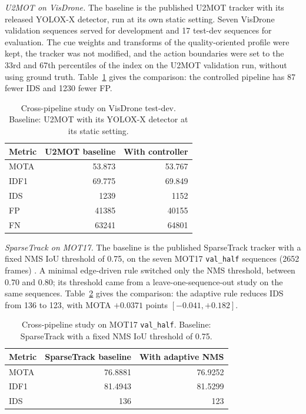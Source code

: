 \documentclass[pdflatex,sn-mathphys-num,iicol]{sn-jnl}
\begin{document}
\emph{U2MOT on VisDrone.} The baseline is the published U2MOT tracker
\cite{liu2023u2mot} with its released YOLOX-X detector, run
at its own static setting. Seven VisDrone validation sequences served for
development and 17 test-dev sequences for evaluation. The cue weights and
transforms of the quality-oriented profile were kept, the tracker was not
modified, and the action boundaries were set to the 33rd and 67th percentiles
of the index on the U2MOT validation run, without using ground truth.
Table~\ref{tab:u2mot} gives the comparison: the controlled pipeline has 87
fewer IDS and 1230 fewer FP.

\begin{table}[t]
\caption{Cross-pipeline study on VisDrone test-dev. Baseline: U2MOT with its
YOLOX-X detector at its static setting.}
\label{tab:u2mot}
\centering\footnotesize
\setlength{\tabcolsep}{4pt}
\begin{tabular}{@{}lrr@{}}
\toprule
Metric & U2MOT baseline & With controller\\
\midrule
MOTA & 53.873 & 53.767\\
IDF1 & 69.775 & 69.849\\
IDS & 1239 & 1152\\
FP & 41385 & 40155\\
FN & 63241 & 64801\\
\bottomrule
\end{tabular}
\end{table}

\emph{SparseTrack on MOT17.} The baseline is the published SparseTrack tracker
\cite{liu2025sparsetrack} with a fixed NMS IoU threshold of 0.75, on the seven
MOT17 \texttt{val\_half} sequences (2652 frames) \cite{dendorfer2021motchallenge}.
A minimal edge-driven rule switched only the NMS threshold, between 0.70 and
0.80; its threshold came from a leave-one-sequence-out study on the same
sequences. Table~\ref{tab:sparsetrack} gives the comparison: the adaptive rule
reduces IDS from 136 to 123, with MOTA $+0.0371$ points $[-0.041, +0.182]$.

\begin{table}[t]
\caption{Cross-pipeline study on MOT17 \texttt{val\_half}. Baseline:
SparseTrack with a fixed NMS IoU threshold of 0.75.}
\label{tab:sparsetrack}
\centering\footnotesize
\setlength{\tabcolsep}{4pt}
\begin{tabular}{@{}lrr@{}}
\toprule
Metric & SparseTrack baseline & With adaptive NMS\\
\midrule
MOTA & 76.8881 & 76.9252\\
IDF1 & 81.4943 & 81.5299\\
IDS & 136 & 123\\
\bottomrule
\end{tabular}
\end{table}
\end{document}
